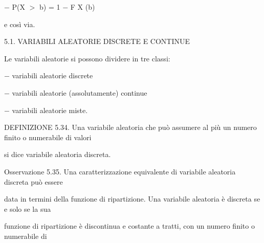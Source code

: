 \documentclass[a4paper,portrait,12pt]{article}
\begin{document}
\begin{flushleft}
$-$ P(X $>$ b) = 1 $-$ F X (b)
\end{flushleft}


\begin{flushleft}
e così via.
\end{flushleft}





\begin{flushleft}
5.1. VARIABILI ALEATORIE DISCRETE E CONTINUE
\end{flushleft}


\begin{flushleft}
Le variabili aleatorie si possono dividere in tre classi:
\end{flushleft}


\begin{flushleft}
$-$ variabili aleatorie discrete
\end{flushleft}


\begin{flushleft}
$-$ variabili aleatorie (assolutamente) continue
\end{flushleft}


\begin{flushleft}
$-$ variabili aleatorie miste.
\end{flushleft}


\begin{flushleft}
DEFINIZIONE 5.34. Una variabile aleatoria che pu\`{o} assumere al più un numero finito o numerabile di valori
\end{flushleft}


\begin{flushleft}
si dice variabile aleatoria discreta.
\end{flushleft}


\begin{flushleft}
Osservazione 5.35. Una caratterizzazione equivalente di variabile aleatoria discreta pu\`{o} essere
\end{flushleft}


\begin{flushleft}
data in termini della funzione di ripartizione. Una variabile aleatoria \`{e} discreta se e solo se la sua
\end{flushleft}


\begin{flushleft}
funzione di ripartizione \`{e} discontinua e costante a tratti, con un numero finito o numerabile di
\end{flushleft}
\end{document}
